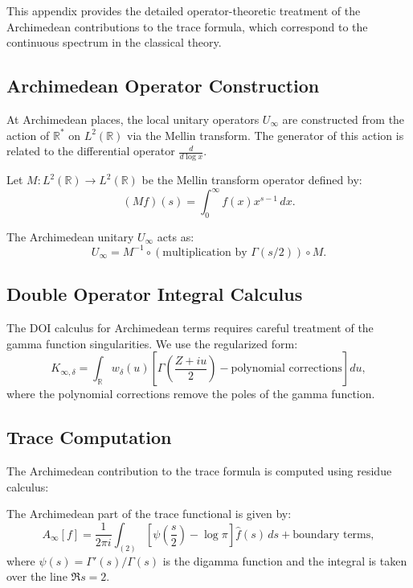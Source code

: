 This appendix provides the detailed operator-theoretic treatment of the Archimedean contributions to the trace formula, which correspond to the continuous spectrum in the classical theory.

\subsection{Archimedean Operator Construction}

At Archimedean places, the local unitary operators \( U_\infty \) are constructed from the action of \( \mathbb{R}^* \) on \( L^2(\mathbb{R}) \) via the Mellin transform. The generator of this action is related to the differential operator \( \frac{d}{d \log x} \).

Let \( M : L^2(\mathbb{R}) \to L^2(\mathbb{R}) \) be the Mellin transform operator defined by:
\[
(M f)(s) = \int_0^\infty f(x) x^{s-1} \, dx.
\]

The Archimedean unitary \( U_\infty \) acts as:
\[
U_\infty = M^{-1} \circ (\text{multiplication by } \Gamma(s/2)) \circ M.
\]

\subsection{Double Operator Integral Calculus}

The DOI calculus for Archimedean terms requires careful treatment of the gamma function singularities. We use the regularized form:
\[
K_{\infty,\delta} = \int_{\mathbb{R}} w_\delta(u) \left[ \Gamma\left(\frac{Z + iu}{2}\right) - \text{polynomial corrections} \right] du,
\]
where the polynomial corrections remove the poles of the gamma function.

\subsection{Trace Computation}

The Archimedean contribution to the trace formula is computed using residue calculus:

\begin{proposition}
The Archimedean part of the trace functional is given by:
\[
A_\infty[f] = \frac{1}{2\pi i} \int_{(2)} \left[ \psi\left(\frac{s}{2}\right) - \log \pi \right] \hat{f}(s) \, ds + \text{boundary terms},
\]
where \( \psi(s) = \Gamma'(s)/\Gamma(s) \) is the digamma function and the integral is taken over the line \( \Re s = 2 \).
\end{proposition}


